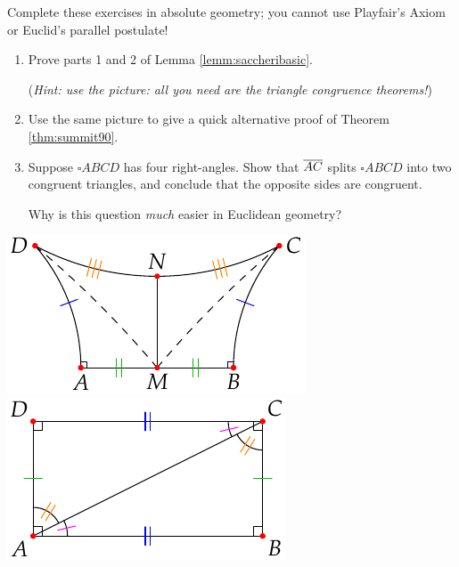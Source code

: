 \begin{exercises}
Complete these exercises in absolute geometry; you cannot use Playfair's Axiom or Euclid's parallel postulate!

\begin{minipage}[t]{0.64\linewidth}\vspace{-5pt}
\begin{enumerate}
  \item Prove parts 1 and 2 of Lemma \ref{lemm:saccheribasic}.\par
  (\emph{Hint: use the picture: all you need are the triangle congruence theorems!})
	\item Use the same picture to give a quick alternative proof of Theorem \ref{thm:summit90}.

	\item\label{exs:rectanglesplit} Suppose $\square ABCD$ has four right-angles. Show that $\overline{AC}$ splits $\square ABCD$ into two congruent triangles, and conclude that the opposite sides are congruent.\par
	Why is this question \emph{much} easier in Euclidean geometry?
\end{enumerate}
\end{minipage}\begin{minipage}[t]{0.35\linewidth}\vspace{-15pt}
\flushright\includegraphics[scale=1]{history-saccheri2}\\
\includegraphics{basic-rect}
\end{minipage}
\end{exercises}

